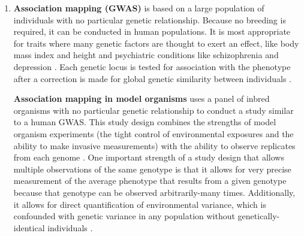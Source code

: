 \begin{enumerate}
	\item \textbf{Association mapping (GWAS)} is based on a large population of individuals with no particular genetic relationship.
	Because no breeding is required, it can be conducted in human populations.
	It is most appropriate for traits where many genetic factors are thought to exert an effect, like body mass index \citep{Speliotes2010,Locke2015} and height \citep{Allen2010,Wood2014-fh} and psychiatric conditions like schizophrenia \citep{Ripke2014a} and depression \citep{PGC2017}.
	Each genetic locus is tested for association with the phenotype after a correction is made for global genetic similarity between individuals \citep{Lippert2011,Zhou2012}.


	\textbf{Association mapping in model organisms} uses a panel of inbred organisms with no particular genetic relationship to conduct a study similar to a human GWAS.
	This study design combines the strengths of model organism experiments (the tight control of environmental exposures and the ability to make invasive measurements) with the ability to observe replicates from each genome \citep{Payseur2007a,Kang2008,Kirby2010a}.
	One important strength of a study design that allows multiple observations of the same genotype is that it allows for very precise measurement of the average phenotype that results from a given genotype because that genotype can be observed arbitrarily-many times.
	Additionally, it allows for direct quantification of environmental variance, which is confounded with genetic variance in any population without genetically-identical individuals \citep{Falconer1965,Lynch1998}.

\end{enumerate}
	

